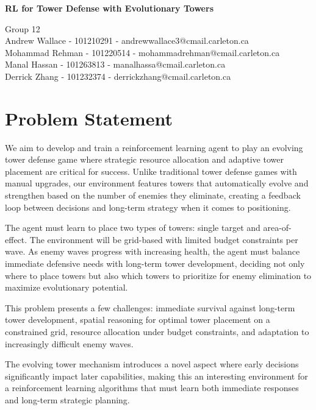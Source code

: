 \documentclass[12pt]{article}
\begin{document}
 

\begin{center} \Large\bf
RL for Tower Defense with Evolutionary Towers\\
\end{center} 

\begin{center}
Group 12 \\
Andrew Wallace - 101210291 - andrewwallace3@cmail.carleton.ca\\
Mohammad Rehman - 101220514 - mohammadrehman@cmail.carleton.ca \\
Manal Hassan - 101263813 - manalhassa@cmail.carleton.ca\\
Derrick Zhang - 101232374 - derrickzhang@cmail.carleton.ca
\end{center}

\section*{Problem Statement}
We aim to develop and train a reinforcement learning agent to play an evolving tower defense game where strategic resource allocation and adaptive tower placement are critical for success. Unlike traditional tower defense games with manual upgrades, our environment features towers that automatically evolve and strengthen based on the number of enemies they eliminate, creating a feedback loop between decisions and long-term strategy when it comes to positioning.\par

The agent must learn to place two types of towers: single target and area-of-effect. The environment will be grid-based with limited budget constraints per wave. As enemy waves progress with increasing health, the agent must balance immediate defensive needs with long-term tower development, deciding not only where to place towers but also which towers to prioritize for enemy elimination to maximize evolutionary potential.\par

This problem presents a few challenges: immediate survival against long-term tower development, spatial reasoning for optimal tower placement on a constrained grid, resource
allocation under budget constraints, and adaptation to increasingly difficult enemy waves.\par

The evolving tower mechanism introduces a novel aspect where early decisions significantly
impact later capabilities, making this an interesting environment for a reinforcement learning
algorithms that must learn both immediate responses and long-term strategic planning.\par
\end{document}
